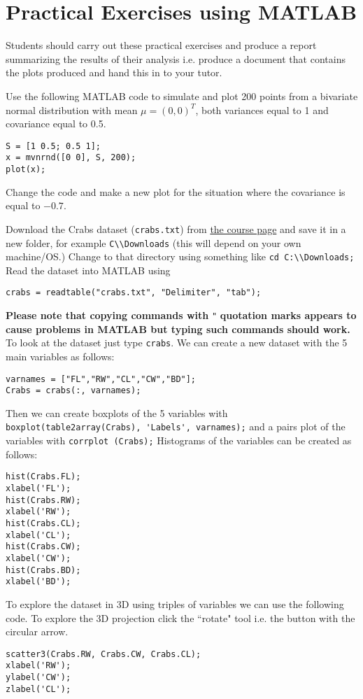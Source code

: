 \documentclass[answers]{exam}
\begin{document}
\section*{Practical Exercises using MATLAB}
Students should carry out these practical exercises and produce a report summarizing the results of their analysis i.e. produce a document that contains the plots produced and hand this in to your tutor.
\begin{questions}
\question%
Use the following MATLAB code to simulate and plot 200 points from a bivariate normal distribution with mean $\mu=(0,0)^{T}$, both variances equal to 1 and covariance equal to 0.5. \begin{verbatim}
S = [1 0.5; 0.5 1];
x = mvnrnd([0 0], S, 200);
plot(x);
\end{verbatim} Change the code and make a new plot for the situation where the covariance is equal to $-0.7$.



\question%
Download the Crabs dataset (\texttt{crabs.txt}) from \href{https://courses.maths.ox.ac.uk/course/view.php?id=620}{the course page} and save it in a new folder, for example \verb|C\\Downloads| (this will depend on your own machine/OS.) Change to that directory using something like \verb|cd C:\\Downloads;| Read the dataset into MATLAB using \begin{verbatim}
crabs = readtable("crabs.txt", "Delimiter", "tab");
\end{verbatim} \textbf{Please note that copying commands with} \verb|"| \textbf{quotation marks appears to cause problems in MATLAB but typing such commands should work.} To look at the dataset just type \verb|crabs|. We can create a new dataset with the 5 main variables as follows: \begin{verbatim}
varnames = ["FL","RW","CL","CW","BD"];
Crabs = crabs(:, varnames);
\end{verbatim} Then we can create boxplots of the 5 variables with \verb|boxplot(table2array(Crabs), 'Labels', varnames);| and a pairs plot of the variables with \verb|corrplot (Crabs);| Histograms of the variables can be created as follows: \begin{verbatim}
hist(Crabs.FL);
xlabel('FL');
hist(Crabs.RW);
xlabel('RW');
hist(Crabs.CL);
xlabel('CL');
hist(Crabs.CW);
xlabel('CW');
hist(Crabs.BD);
xlabel('BD');
\end{verbatim} To explore the dataset in 3D using triples of variables we can use the following code. To explore the 3D projection click the ``rotate" tool i.e. the button with the circular arrow. \begin{verbatim}
scatter3(Crabs.RW, Crabs.CW, Crabs.CL);
xlabel('RW');
ylabel('CW');
zlabel('CL');
\end{verbatim}

\end{questions}
\end{document}
